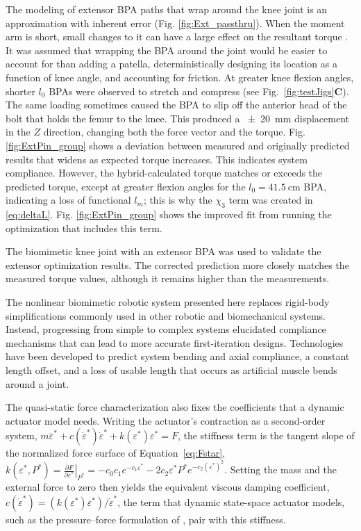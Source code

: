 The modeling of extensor BPA paths that wrap around the knee joint is an approximation with inherent error (Fig. \ref{fig:Ext_passthru}). When the moment arm is short, small changes to it can have a large effect on the resultant torque \citep{young_analyzing_2019}. It was assumed that wrapping the BPA around the joint would be easier to account for than adding a patella, deterministically designing its location as a function of knee angle, and accounting for friction. At greater knee flexion angles, shorter $l_{0}$ BPAs were observed to stretch and compress (see Fig.~\ref{fig:testJigs}\textbf{C}). The same loading sometimes caused the BPA to slip off the anterior head of the bolt that holds the femur to the knee. This produced a \qty{\pm 20}{\mm} displacement in the $Z$ direction, changing both the force vector and the torque. Fig. \ref{fig:ExtPin_group} shows a deviation between measured and originally predicted results that widens as expected torque increases. This indicates system compliance. However, the hybrid-calculated torque matches or exceeds the predicted torque, except at greater flexion angles for the $l_{0}=\qty{41.5}{\cm}$ BPA, indicating a loss of functional $l_m$; this is why the $\chi_{3}$ term was created in \eqref{eq:deltaL}. Fig. \ref{fig:ExtPin_group} shows the improved fit from running the optimization that includes this term.

The biomimetic knee joint with an extensor BPA was used to validate the extensor optimization results. The corrected prediction more closely matches the measured torque values, although it remains higher than the measurements.


The nonlinear biomimetic robotic system presented here replaces rigid-body simplifications commonly used in other robotic and biomechanical systems. Instead, progressing from simple to complex systems elucidated compliance mechanisms that can lead to more accurate first-iteration designs. Technologies have been developed to predict system bending and axial compliance, a constant length offset, and a loss of usable length that occurs as artificial muscle bends around a joint. 

The quasi-static force characterization also fixes the coefficients that a dynamic actuator model needs. Writing the actuator's contraction as a second-order system, $m\ddot \varepsilon^* + c (\dot \varepsilon^* ) \dot \varepsilon^* + k ( \varepsilon^* ) \varepsilon^* = F$, the stiffness term is the tangent slope of the normalized force surface of Equation~\eqref{eq:Fstar}, $k(\varepsilon^{*}, P^{*})
= \left.\frac{\partial F}{\partial \varepsilon^{*}}\right|_{P^{*}}
= -c_{0}c_{1}e^{-c_{1}\varepsilon^{*}}
  - 2c_{2}\varepsilon^{*}P^{*}e^{-c_{2}(\varepsilon^{*})^{2}}$. Setting the mass and the external force to zero then yields the equivalent viscous damping coefficient, $c (\dot \varepsilon^* ) = (k ( \varepsilon^* ) \varepsilon^*)/\dot \varepsilon^*$, the term that dynamic state-space actuator models, such as the pressure--force formulation of \citet{elzein_pressure_2025}, pair with this stiffness.

